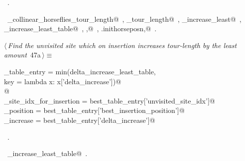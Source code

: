 \documentclass[11.5pt]{report}
\begin{document}
\begin{flushleft}
\begin{list}{}{}
\mbox{}\verb@                                   'delta_increase'          : delta_increase_least})@\\
\mbox{}\verb@@{\NWsep}
\end{list}
\vspace{-1.5ex}
\footnotesize
\begin{list}{}{\setlength{\itemsep}{-\parsep}\setlength{\itemindent}{-\leftmargin}}
\item \NWtxtMacroRefIn\ .
\item \NWtxtIdentsUsed\nobreak\  \verb@compute_collinear_horseflies_tour_length@\nobreak\ , \verb@current_tour_length@\nobreak\ , \verb@delta_increase_least@\nobreak\ , \verb@delta_increase_least_table@\nobreak\ , \verb@ibest,@\nobreak\ , \verb@self.inithorseposn,@\nobreak\ .
\item{}
\end{list}
\vspace{4ex}
\end{flushleft}


\vspace{-0.8cm}\newchunk 

\begin{flushleft} \small\label{scrap73}\raggedright\small
{} $\langle\,${\itshape Find the unvisited site which on insertion increases tour-length by the least amount}\nobreak\ {\footnotesize {47a}}$\,\rangle\equiv$
\vspace{-1ex}
\begin{list}{}{} \item
\mbox{}\verb@best_table_entry = min(delta_increase_least_table, \@\\
\mbox{}\verb@                         key = lambda x: x['delta_increase'])@\\
\mbox{}\verb@         @\\
\mbox{}\verb@unvisited_site_idx_for_insertion = best_table_entry['unvisited_site_idx']@\\
\mbox{}\verb@insertion_position               = best_table_entry['best_insertion_position']@\\
\mbox{}\verb@delta_increase                   = best_table_entry['delta_increase']@\\
\mbox{}\verb@@{\NWsep}
\end{list}
\vspace{-1.5ex}
\footnotesize
\begin{list}{}{\setlength{\itemsep}{-\parsep}\setlength{\itemindent}{-\leftmargin}}
\item \NWtxtMacroRefIn\ .
\item \NWtxtIdentsUsed\nobreak\  \verb@delta_increase_least_table@\nobreak\ .
\item{}
\end{list}
\vspace{4ex}
\end{flushleft}
\end{document}
